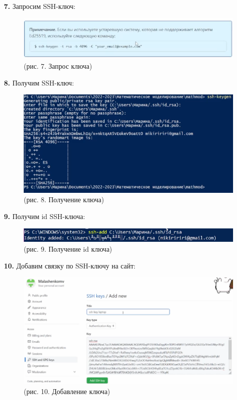 \documentclass[
  12pt,
  a4paper,
]{scrreprt}
\begin{document}
\textbf{7.} Запросим SSH-ключ:

\begin{figure}
\centering
\includegraphics{./tex2pdf.-cbf55669a78d292a/image/7.PNG}
\caption{(рис. 7. Запрос ключа)}
\end{figure}

\textbf{8.} Получим SSH-ключ:

\begin{figure}
\centering
\includegraphics{./tex2pdf.-cbf55669a78d292a/image/8.PNG}
\caption{(рис. 8. Получение ключа)}
\end{figure}

\textbf{9.} Получим id SSH-ключа:

\begin{figure}
\centering
\includegraphics{./tex2pdf.-cbf55669a78d292a/image/9.PNG}
\caption{(рис. 9. Получение id ключа)}
\end{figure}

\textbf{10.} Добавим связку по SSH-ключу на сайт:

\begin{figure}
\centering
\includegraphics{./tex2pdf.-cbf55669a78d292a/image/10.PNG}
\caption{(рис. 10. Добавление ключа)}
\end{figure}
\end{document}
